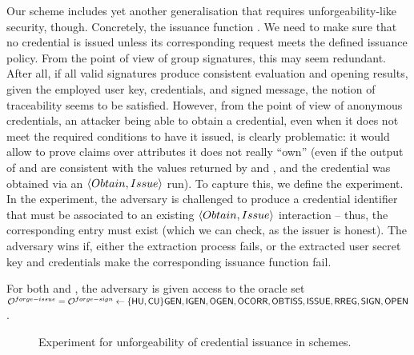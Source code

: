 Our \UAS scheme includes yet another generalisation that requires unforgeability-like
security, though. Concretely, the issuance function \fissue. We need to make
sure that no credential is issued unless its corresponding
request meets the defined issuance policy. From the point of view of group
signatures, this may seem redundant. After all, if all valid signatures produce
consistent evaluation and opening results, given the employed user key,
credentials, and signed message, the notion of traceability seems to be
satisfied. However, from the point of view of anonymous credentials, an attacker
being able to obtain a credential, even when it does not meet the required
conditions to have it issued, is clearly problematic: it would allow to prove
claims over attributes it does not really ``own'' (even if the output of \Sign
and \Open are consistent with the values returned by \feval and \finsp, and
the credential was obtained via an $\langle Obtain,Issue \rangle$ run). To
capture this, we define the \ExpForgeIssue experiment. In the experiment, the
adversary is challenged to produce a credential identifier that must be
associated to an existing $\langle Obtain,Issue \rangle$ interaction -- thus,
the corresponding \trans entry must exist (which we can check, as the issuer is
honest). The adversary wins if, either the extraction process fails, or the
extracted user secret key and credentials make the corresponding issuance
function fail.

For both \ExpForgeIssue and \ExpForgeSign, the adversary is given access to the
oracle set $\mathcal{O}^{forge-issue} = \mathcal{O}^{forge-sign} \gets \lbrace\mathsf{HU},\mathsf{CU}\rbrace\mathsf{GEN},\mathsf{IGEN},
\mathsf{OGEN},\mathsf{OCORR},\mathsf{OBTISS},\mathsf{ISSUE},\mathsf{RREG},\mathsf{SIGN},\mathsf{OPEN}$.

\begin{figure}[htp!]
  \caption{Experiment for unforgeability of credential issuance in \UAS schemes.}
  \label{fig:exp-uas-unfor-issue}
\end{figure}    

